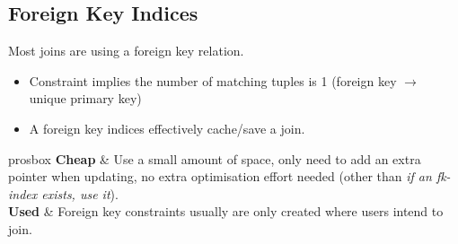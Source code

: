 \subsection{Foreign Key Indices}
Most joins are using a foreign key relation.
\begin{itemize}
    \item Constraint implies the number of matching tuples is 1 (foreign key $\to$ unique primary key)
    \item A foreign key indices effectively cache/save a join.
\end{itemize}
\begin{tabbox}{prosbox}
    \textbf{Cheap} & Use a small amount of space, only need to add an extra pointer when updating, no extra optimisation effort needed (other than \textit{if an fk-index exists, use it}). \\
    \textbf{Used} & Foreign key constraints usually are only created where users intend to join. \\
\end{tabbox}
